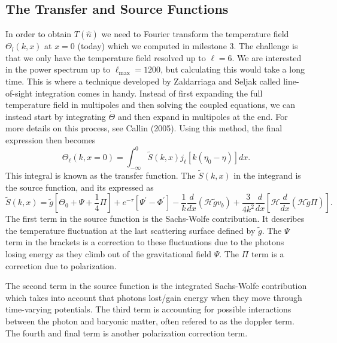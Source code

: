 \documentclass[a4paper, 10pt, reqno]{amsart}
\begin{document}
\subsection{The Transfer and Source Functions}
In order to obtain $T(\hat{n})$ we need to Fourier transform the temperature field $\Theta_l(k,x)$ at $x=0$ (today) which we computed in milestone 3. The challenge is that we only have the temperature field resolved up to $\ell = 6$. We are interested in the power spectrum up to $\ell_\mathrm{max} = 1200$, but calculating this would take a long time. This is where a technique developed by Zaldarriaga and Seljak called line-of-sight integration comes in handy. Instead of first expanding the full temperature field in multipoles and then solving the coupled equations, we can instead start by integrating $\dot{\Theta}$ and then expand in multipoles at the end. For more details on this process, see Callin (2005). Using this method, the final expression then becomes
\begin{equation}\label{eq: transfer}
    \Theta_{\ell}(k, x=0)=\int_{-\infty}^{0} \tilde{S}(k, x) j_{\ell}\left[k\left(\eta_{0}-\eta\right)\right] d x.
\end{equation}
This integral is known as the transfer function. The $\tilde{S}(k, x)$ in the integrand is the source function, and its expressed as
\begin{equation}
    \tilde{S}(k, x)=\tilde{g}\left[\Theta_{0}+\Psi+\frac{1}{4} \Pi\right]+e^{-\tau}\left[\Psi^{\prime}-\Phi^{\prime}\right]-\frac{1}{k} \frac{d}{d x}\left(\mathcal{H} \tilde{g} v_{b}\right)+\frac{3}{4 k^{2}} \frac{d}{d x}\left[\mathcal{H} \frac{d}{d x}(\mathcal{H} \tilde{g} \Pi)\right].
\end{equation}
The first term in the source function is the Sachs-Wolfe contribution. It describes the temperature fluctuation at the last scattering surface defined by $\tilde{g}$. The $\Psi$ term in the brackets is a correction to these fluctuations due to the photons losing energy as they climb out of the gravitational field $\Psi$. The $\Pi$ term is a correction due to polarization. 

The second term in the source function is the integrated Sachs-Wolfe contribution which takes into account that photons lost/gain energy when they move through time-varying potentials. The third term is accounting for possible interactions between the photon and baryonic matter, often refered to as the doppler term. The fourth and final term is another polarization correction term. 
\end{document}
